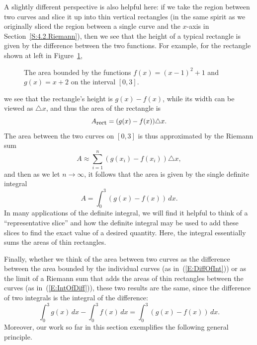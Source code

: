A slightly different perspective is also helpful here:  if we take the region between two curves and slice it up into thin vertical rectangles (in the same spirit as we originally sliced the region between a single curve and the $x$-axis in Section~\ref{S:4.2.Riemann}), then we see that the height of a typical rectangle is given by the difference between the two functions.  For example, for the rectangle shown at left in Figure~\ref{F:6.1.PA1revisited2}, 
\begin{figure}[h]
\begin{center}
\caption{The area bounded by the functions $f(x) = (x-1)^2 + 1$ and $g(x) = x+2$ on the interval $[0,3]$.} \label{F:6.1.PA1revisited2}
\end{center}
\end{figure}
we see that the rectangle's height is $g(x) - f(x)$, while its width can be viewed as $\triangle x$, and thus the area of the rectangle is
$$A_{\mbox{\small{rect}}} = (g(x) - f(x)) \triangle x.$$
The area between the two curves on $[0,3]$ is thus approximated by the Riemann sum
$$A \approx \sum_{i=1}^{n} (g(x_i) - f(x_i)) \triangle x,$$
and then as we let $n \to \infty$, it follows that the area is given by the single definite integral
\begin{equation} \label{E:IntOfDiff}
A = \int_0^3 (g(x) - f(x)) \, dx.
\end{equation}
In many applications of the definite integral, we will find it helpful to think of a ``representative slice'' and how the definite integral may be used to add these slices to find the exact value of a desired quantity.  Here, the integral essentially sums the areas of thin rectangles.

Finally, whether we think of the area between two curves as the difference between the area bounded by the individual curves (as in~(\ref{E:DiffOfInt})) or as the limit of a Riemann sum that adds the areas of thin rectangles between the curves (as in~(\ref{E:IntOfDiff})), these two results are the same, since the difference of two integrals is the integral of the difference:
$$\int_0^3 g(x) \, dx -  \int_0^3 f(x) \, dx = \int_0^3 (g(x) - f(x)) \, dx.$$
Moreover, our work so far in this section exemplifies the following general principle.

